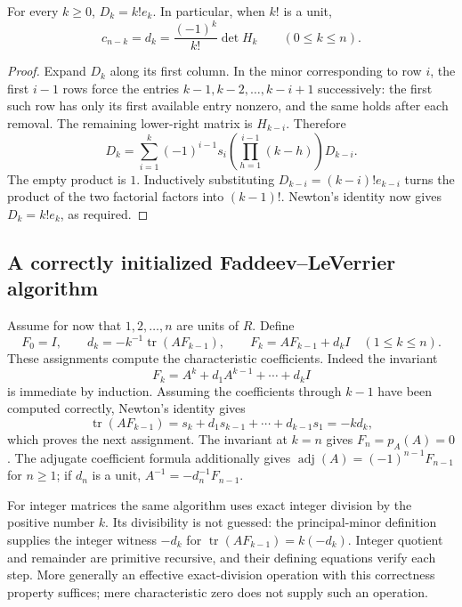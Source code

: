 \begin{theorem}
\label{thm:trace-hessenberg}
For every $k\geq0$, $D_k=k!e_k$.  In particular, when $k!$ is a unit,
\[
 c_{n-k}=d_k=\frac{(-1)^k}{k!}\det H_k\qquad(0\leq k\leq n).
\]
\end{theorem}
\begin{proof}
Expand $D_k$ along its first column.  In the minor corresponding to row $i$,
the first $i-1$ rows force the entries
$k-1,k-2,\ldots,k-i+1$ successively: the first such row has only its first
available entry nonzero, and the same holds after each removal.  The
remaining lower-right matrix is $H_{k-i}$.  Therefore
\[
 D_k=\sum_{i=1}^k(-1)^{i-1}s_i
       \left(\prod_{h=1}^{i-1}(k-h)\right)D_{k-i}.
\]
The empty product is $1$.  Inductively substituting
$D_{k-i}=(k-i)!e_{k-i}$ turns the product of the two factorial factors into
$(k-1)!$.  Newton's identity now gives $D_k=k!e_k$, as required.
\end{proof}

\subsection{A correctly initialized Faddeev--LeVerrier algorithm}

Assume for now that $1,2,\ldots,n$ are units of $R$.  Define
\begin{equation}
 F_0=I,\qquad
 d_k=-k^{-1}\operatorname{tr}(AF_{k-1}),\qquad
 F_k=AF_{k-1}+d_k I\quad(1\leq k\leq n).
 \label{eq:trace-flv}
\end{equation}
These assignments compute the characteristic coefficients.  Indeed the
invariant
\[
 F_k=A^k+d_1A^{k-1}+\cdots+d_kI
\]
is immediate by induction.  Assuming the coefficients through $k-1$ have
been computed correctly, Newton's identity gives
\[
 \operatorname{tr}(AF_{k-1})
  =s_k+d_1s_{k-1}+\cdots+d_{k-1}s_1=-k d_k,
\]
which proves the next assignment.  The invariant at $k=n$ gives
$F_n=p_A(A)=0$.  The adjugate coefficient formula additionally gives
$\operatorname{adj}(A)=(-1)^{n-1}F_{n-1}$ for $n\geq1$; if $d_n$ is a unit,
$A^{-1}=-d_n^{-1}F_{n-1}$.

For integer matrices the same algorithm uses exact integer division by
the positive number $k$.  Its divisibility is not guessed: the principal-minor
definition supplies the integer witness $-d_k$ for
$\operatorname{tr}(AF_{k-1})=k(-d_k)$.  Integer quotient and remainder are
primitive recursive, and their defining equations verify each step.  More
generally an effective exact-division operation with this correctness
property suffices; mere characteristic zero does not supply such an operation.

